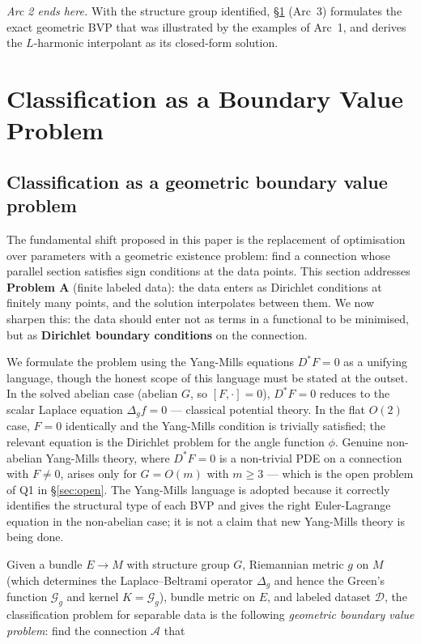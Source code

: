 \documentclass[11pt, a4paper]{article}
\theoremstyle{plain}
\theoremstyle{definition}
\newcommand{\Sig}{\mathcal{A}}
\newcommand{\Gr}{\mathcal{G}}   %
\begin{document}
\medskip
\noindent\textit{Arc 2 ends here.} With the structure group identified,
\S\ref{sec:yang-mills} (Arc~3) formulates the exact geometric BVP that was
illustrated by the examples of Arc~1, and derives the $L$-harmonic interpolant as
its closed-form solution.

\section{Classification as a Boundary Value Problem}\label{sec:yang-mills}

\subsection{Classification as a geometric boundary value problem}

The fundamental shift proposed in this paper is the replacement of optimisation
over parameters with a geometric existence problem: find a connection whose
parallel section satisfies sign conditions at the data points. This section
addresses \textbf{Problem A} (finite labeled data): the data enters as Dirichlet
conditions at finitely many points, and the solution interpolates between them.
We now sharpen this: the data should enter not as terms in a functional to be
minimised, but as \textbf{Dirichlet boundary conditions} on the connection.

We formulate the problem using the Yang-Mills equations $D^*F = 0$ as a unifying
language, though the honest scope of this language must be stated at the outset.
In the solved abelian case (abelian $G$, so $[F,\cdot] = 0$), $D^*F = 0$ reduces to the scalar
Laplace equation $\Delta_g f = 0$ --- classical potential theory. In the flat
$O(2)$ case, $F = 0$ identically and the Yang-Mills condition is trivially
satisfied; the relevant equation is the Dirichlet problem for the angle function
$\phi$. Genuine non-abelian Yang-Mills theory, where $D^*F = 0$ is a non-trivial
PDE on a connection with $F \neq 0$, arises only for $G = O(m)$ with $m \geq 3$
--- which is the open problem of Q1 in \S\ref{sec:open}. The Yang-Mills language
is adopted because it correctly identifies the structural type of each BVP and
gives the right Euler-Lagrange equation in the non-abelian case; it is not a
claim that new Yang-Mills theory is being done.

Given a bundle $E \to M$ with structure group $G$, Riemannian metric $g$ on
$M$ (which determines the Laplace--Beltrami operator $\Delta_g$ and hence the
Green's function $\Gr_g$ and kernel $K = \Gr_g$), bundle metric on $E$, and
labeled dataset $\mathcal{D}$, the
classification problem for separable data is the following \emph{geometric
boundary value problem}: find the connection $\Sig$ that
\end{document}
